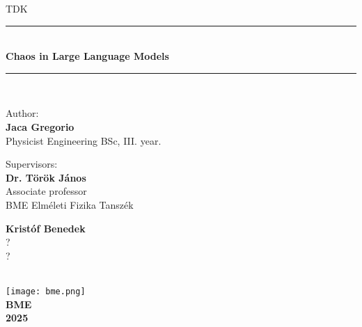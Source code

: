 \documentclass[a4paper,12pt]{article}
\begin{document}
\begin{titlepage}
\newcommand{\HRule}{\rule{\linewidth}{0.5mm}}
\center
\huge\textsc{TDK}
\HRule \\[0.4cm]
{ \huge \bfseries Chaos in Large Language Models}\\[0.2cm] 
\HRule \\[0.5cm]
\begin{minipage}[t]{0.4\textwidth}
\begin{flushleft} \large
Author: \\
\Large\textbf{Jaca Gregorio}\\
\large{Physicist Engineering BSc, III. year.}
\end{flushleft}
\end{minipage}
\qquad
\begin{minipage}[t]{0.4\textwidth}
\begin{flushleft}\large
Supervisors: \\
\Large\textbf{Dr. Török János}\\
\large Associate professor \\
BME Elméleti Fizika Tanszék

\Large\textbf{Kristóf Benedek}\\
\large ? \\
?
\end{flushleft}
\end{minipage}
\\[6cm]
\texttt{[image: bme.png]}\\[0.2cm]
\large{\textbf{BME}}\\
\large{\textbf{2025}}
\vfill
\end{titlepage}

\newpage\null\thispagestyle{empty}\newpage



\end{document}
